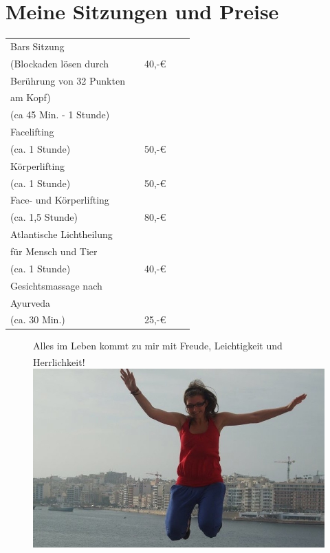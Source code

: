 \documentclass[10pt,foldmark,notumble]{leaflet}
\begin{document}
\section{Meine Sitzungen und Preise}

 \begin{tabular}{p{40mm}llcc}\hline\hline
Bars Sitzung              &     &  \\
(Blockaden lösen durch & & 40,-€ \\
Berührung von 32 Punkten & & \\
am Kopf) & & \\
(ca 45 Min. - 1 Stunde)  &   &  \\
\hline
Facelifting   &   &  \\
(ca. 1 Stunde) & & 50,-€\\
\hline
Körperlifting   &   &  \\
(ca. 1 Stunde) & & 50,-€\\
\hline
Face- und Körperlifting   &   &  \\
(ca. 1,5 Stunde) & & 80,-€\\
 \hline
Atlantische Lichtheilung   &   &  \\
für Mensch und Tier & & \\
(ca. 1 Stunde) & & 40,-€ \\
\hline
Gesichtsmassage nach  &   &  \\
Ayurveda & & \\
(ca. 30 Min.) & & 25,-€ \\
\hline
\end{tabular}



\newpage

\vspace*{20mm}
\begin{figure}[h!]
 { \large Alles im Leben kommt zu mir mit Freude, Leichtigkeit und Herrlichkeit!\textsuperscript{\textregistered}} 
\includegraphics [scale=.489, angle=270 ]{Bild3.jpg}
\end{figure}
\end{document}
